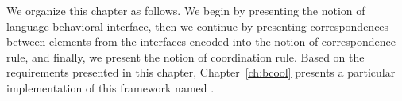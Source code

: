 We organize this chapter as follows. We begin by presenting the notion of language behavioral interface, then we continue by presenting correspondences between elements from the interfaces encoded into the notion of correspondence rule, and finally, we present the notion of coordination rule. Based on the requirements presented in this chapter, Chapter~\ref{ch:bcool} presents a particular implementation of this framework named \bcool.

